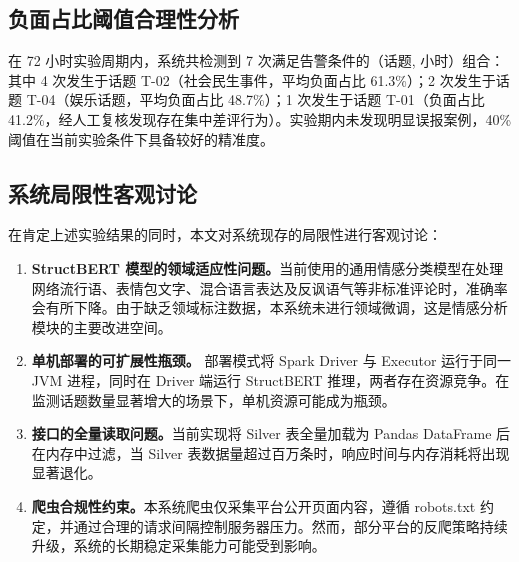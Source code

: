 \subsection{负面占比阈值合理性分析}

在 72 小时实验周期内，系统共检测到 7 次满足告警条件的（话题, 小时）组合：其中 4 次发生于话题 T-02（社会民生事件，平均负面占比 61.3\%）；2 次发生于话题 T-04（娱乐话题，平均负面占比 48.7\%）；1 次发生于话题 T-01（负面占比 41.2\%，经人工复核发现存在集中差评行为）。实验期内未发现明显误报案例，40\% 阈值在当前实验条件下具备较好的精准度。

\subsection{系统局限性客观讨论}

在肯定上述实验结果的同时，本文对系统现存的局限性进行客观讨论：

\begin{enumerate}
  \item \textbf{StructBERT 模型的领域适应性问题。}当前使用的通用情感分类模型在处理网络流行语、表情包文字、混合语言表达及反讽语气等非标准评论时，准确率会有所下降。由于缺乏领域标注数据，本系统未进行领域微调，这是情感分析模块的主要改进空间。

  \item \textbf{单机部署的可扩展性瓶颈。} 部署模式将 Spark Driver 与 Executor 运行于同一 JVM 进程，同时在 Driver 端运行 StructBERT 推理，两者存在资源竞争。在监测话题数量显著增大的场景下，单机资源可能成为瓶颈。

  \item \textbf{ 接口的全量读取问题。}当前实现将 Silver 表全量加载为 Pandas DataFrame 后在内存中过滤，当 Silver 表数据量超过百万条时，响应时间与内存消耗将出现显著退化。

  \item \textbf{爬虫合规性约束。}本系统爬虫仅采集平台公开页面内容，遵循 robots.txt 约定，并通过合理的请求间隔控制服务器压力。然而，部分平台的反爬策略持续升级，系统的长期稳定采集能力可能受到影响。
\end{enumerate}
